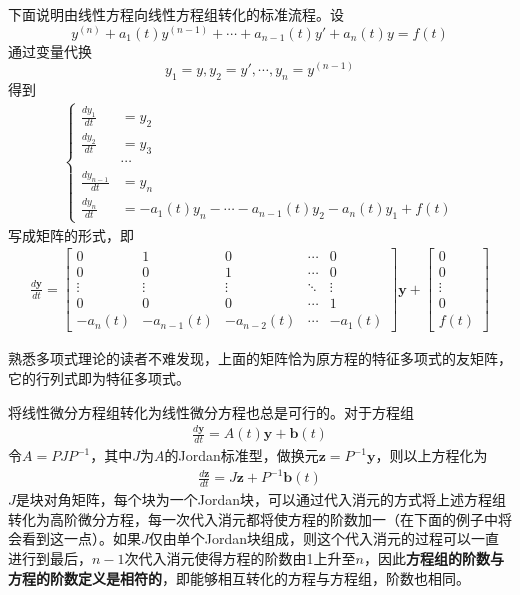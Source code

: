 \documentclass{ctexbook}
\begin{document}
下面说明由线性方程向线性方程组转化的标准流程。设
\[y^{(n)}+a_{1}(t)y^{(n-1)}+\cdots +a_{n-1}(t)y'+a_n(t)y=f(t)\]
通过变量代换
\[y_1=y,y_2=y',\cdots,y_n=y^{(n-1)}\]
得到\begin{align*}
    \begin{cases}
        \frac{dy_1}{dt}&=y_2\\
        \frac{dy_2}{dt}&=y_3\\
        &\cdots\\
        \frac{dy_{n-1}}{dt}&=y_n\\
        \frac{dy_n}{dt}&=-a_{1}(t)y_{n}-\cdots -a_{n-1}(t)y_2-a_n(t)y_1+f(t)
    \end{cases}
\end{align*}
写成矩阵的形式，即\begin{align*}
    \frac{d\mathbf{y}}{dt}=\begin{bmatrix}
    0 & 1 & 0 & \cdots & 0\\
    0 & 0 & 1 & \cdots & 0\\
    \vdots & \vdots & \vdots & \ddots & \vdots\\
    0 & 0 & 0 & \cdots & 1\\
    -a_n(t) & -a_{n-1}(t) & -a_{n-2}(t) & \cdots & -a_1(t)
    \end{bmatrix}\mathbf{y}+\begin{bmatrix}
    0\\
    0\\
    \vdots\\
    0\\
    f(t)
    \end{bmatrix}
\end{align*}

熟悉多项式理论的读者不难发现，上面的矩阵恰为原方程的特征多项式的友矩阵，它的行列式即为特征多项式。

将线性微分方程组转化为线性微分方程也总是可行的。对于方程组\begin{align*}
    \frac{d\mathbf{y}}{dt}=A(t)\mathbf{y}+\mathbf{b}(t)
\end{align*}
令$A=PJP^{-1}$，其中$J$为$A$的Jordan标准型，做换元$\mathbf{z}=P^{-1}\mathbf{y}$，则以上方程化为\begin{align*}
    \frac{d\mathbf{z}}{dt}=J\mathbf{z}+P^{-1}\mathbf{b}(t)
\end{align*}
$J$是块对角矩阵，每个块为一个Jordan块，可以通过代入消元的方式将上述方程组转化为高阶微分方程，每一次代入消元都将使方程的阶数加一（在下面的例子中将会看到这一点）。如果$J$仅由单个Jordan块组成，则这个代入消元的过程可以一直进行到最后，$n-1$次代入消元使得方程的阶数由1上升至$n$，因此\textbf{方程组的阶数与方程的阶数定义是相符的}，即能够相互转化的方程与方程组，阶数也相同。
\end{document}

